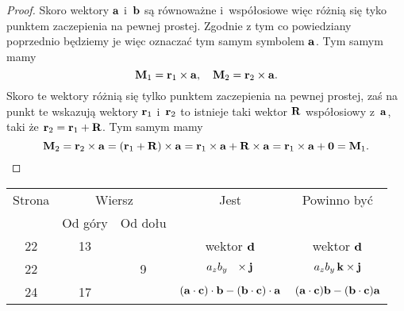 \documentclass[a4paper,11pt]{article}
\numberwithin{equation}{section}
\begin{document}
\begin{proof}

  Skoro wektory
  $\mathbf{a}$ i~$\mathbf{b}$ są równoważne i~współosiowe więc różnią się tyko
  punktem zaczepienia na pewnej prostej. Zgodnie z tym co powiedziany
  poprzednio będziemy je więc oznaczać tym samym symbolem $\mathbf{a}$. Tym
  samym mamy
  \begin{equation}
    \label{eq:SkalmierskiMechanika-07}
    \mathbf{M}_{ 1 } = \mathbf{r}_{ 1 } \times \mathbf{a}, \quad
    \mathbf{M}_{ 2 } = \mathbf{r}_{ 2 } \times \mathbf{a}.
  \end{equation}
  Skoro te wektory różnią się tylko punktem zaczepienia na pewnej prostej,
  zaś na punkt te wskazują wektory $\mathbf{r}_{ 1 }$ i~$\mathbf{r}_{ 2 }$ to
  istnieje taki wektor $\mathbf{R}$ współosiowy z~$\mathbf{a}$, taki że
  $\mathbf{r}_{ 2 } = \mathbf{r}_{ 1 } + \mathbf{R}$. Tym samym mamy
  \begin{equation}
    \label{eq:SkalmierskiMechanika-08}
    \mathbf{M}_{ 2 } =
    \mathbf{r}_{ 2 } \times \mathbf{a} =
    ( \mathbf{r}_{ 1 } + \mathbf{R} ) \times \mathbf{a} =
    \mathbf{r}_{ 1 } \times \mathbf{a} + \mathbf{R} \times \mathbf{a} =
    \mathbf{r}_{ 1 } \times \mathbf{a} + \mathbf{0} = \mathbf{M}_{ 1 }.
  \end{equation}

\end{proof}









\newpage



\begin{center}

  \begin{tabular}{|c|c|c|c|c|}
    \hline
    Strona & \multicolumn{2}{c|}{Wiersz} & Jest
                              & Powinno być \\ \cline{2-3}
    & Od góry & Od dołu & & \\
    \hline
    22 & 13 & & wektor{ }{ }{ }$\mathbf{d}$ & wektor $\mathbf{d}$ \\
    22 & &  9 & $a_{ z } b_{ y } \, \hphantom{k} \times \mathbf{j}$
           & $a_{ z } b_{ y } \, \mathbf{k} \times \mathbf{j}$ \\
    24 & 17 & &  $( \mathbf{a} \cdot \mathbf{c} ) \cdot \mathbf{b}
                - ( \mathbf{b} \cdot \mathbf{c} ) \cdot \mathbf{a}$
           & $( \mathbf{a} \cdot \mathbf{c} ) \mathbf{b}
             - ( \mathbf{b} \cdot \mathbf{c} ) \mathbf{a}$ \\
    \hline
  \end{tabular}

\end{center}
\end{document}
